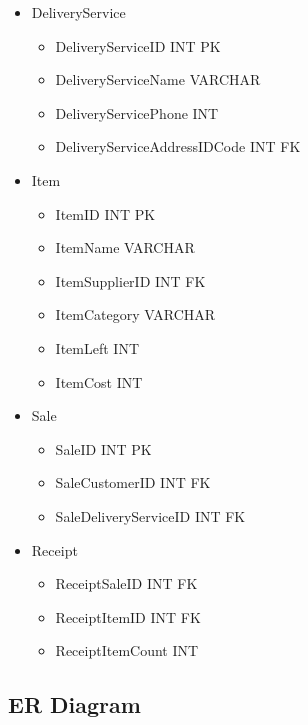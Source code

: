\documentclass[11pt]{article}
\begin{document}
\begin{itemize}
\begin{itemize}
\item SupplierID INT PK
\item SupplierName VARCHAR
\item SupplierPhone INT
\item SupplierAddressIDCode INT FK
\end{itemize}
\item DeliveryService
\begin{itemize}
\item DeliveryServiceID INT PK
\item DeliveryServiceName VARCHAR
\item DeliveryServicePhone INT
\item DeliveryServiceAddressIDCode INT FK
\end{itemize}
\item Item
\begin{itemize}
\item ItemID INT PK
\item ItemName VARCHAR
\item ItemSupplierID INT FK
\item ItemCategory VARCHAR
\item ItemLeft INT
\item ItemCost INT
\end{itemize}
\item Sale
\begin{itemize}
\item SaleID INT PK
\item SaleCustomerID INT FK
\item SaleDeliveryServiceID INT FK
\end{itemize}
\item Receipt
\begin{itemize}
\item ReceiptSaleID INT FK
\item ReceiptItemID INT FK
\item ReceiptItemCount INT
\end{itemize}
\end{itemize}
\subsection{ER Diagram}
\label{sec:org65f6ece}
\end{document}
